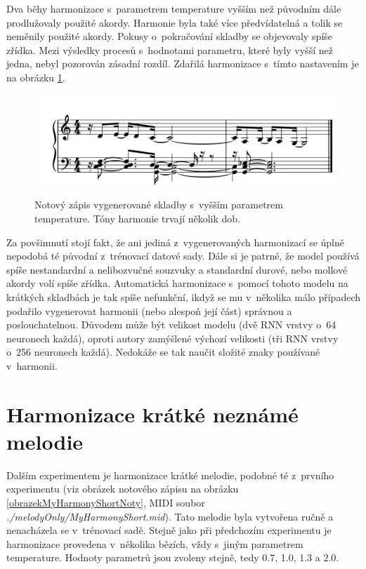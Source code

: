 Dva běhy harmonizace s~parametrem temperature vyšším než původním
dále prodlužovaly použité akordy.
Harmonie byla také více předvídatelná a tolik se neměnily použité akordy.
Pokusy o~pokračování skladby se objevovaly spíše zřídka.
Mezi výsledky procesů s~hodnotami parametru, 
které byly vyšší než jedna, nebyl pozorován zásadní rozdíl.
Zdařilá harmonizace s~tímto nastavením je na obrázku 
\ref{obrazekKratkaSkladbaHarmonizovanaHighNoty}.

\begin{figure}[h]\centering
    \centering
    \includegraphics[width=0.8\linewidth]{obrazky/KratkaSkladbaHarmonizovanaHighNoty-1.png}\\[1pt]  
    \caption{Notový zápis vygenerované skladby s~vyšším parametrem temperature. 
    Tóny harmonie trvají několik dob.}    
    \label{obrazekKratkaSkladbaHarmonizovanaHighNoty}
\end{figure}
\par

Za povšimnutí stojí fakt, 
že ani jediná z~vygenerovaných harmonizací se úplně nepodobá té původní
z~trénovací datové sady.
Dále si je patrné, že model používá spíše nestandardní a nelibozvučné souzvuky
a standardní durové, nebo mollové akordy volí spíše zřídka.
Automatická harmonizace s~pomocí tohoto modelu na krátkých skladbách je tak spíše nefunkční,
ikdyž se mu v~několika málo případech podařilo vygenerovat harmonii 
(nebo alespoň její část) správnou a poslouchatelnou.
Důvodem může být velikost modelu (dvě RNN vrstvy o~64 neuronech každá),
oproti autory zamýšlené výchozí velikosti (tři RNN vrstvy o~256 neuronech každá).
Nedokáže se tak naučit složité znaky používané v~harmonii.

\section{Harmonizace krátké neznámé melodie}
Dalším experimentem je harmonizace krátké melodie, 
podobné té z~prvního experimentu 
(viz obrázek notového zápisu na obrázku \ref{obrazekMyHarmonyShortNoty}, 
MIDI soubor \emph{./melodyOnly/MyHarmonyShort.mid}).
Tato melodie byla vytvořena ručně 
a nenacházela se v~trénovací sadě.
Stejně jako při předchozím experimentu 
je harmonizace provedena v~několika bězích, 
vždy s~jiným parametrem temperature.
Hodnoty parametrů jsou zvoleny stejně, tedy 0.7, 1.0, 1.3 a 2.0.
\par

